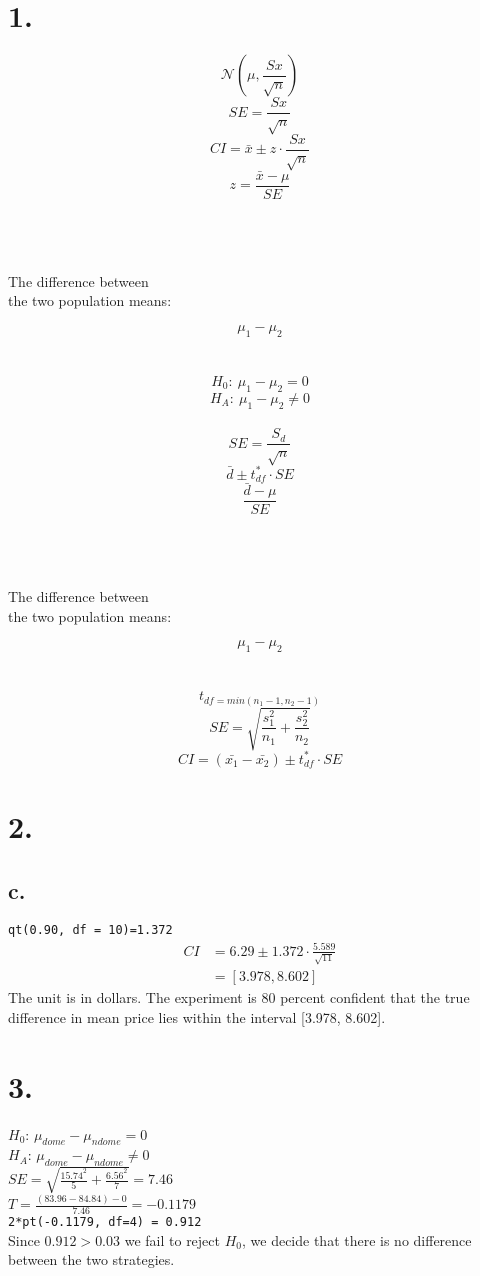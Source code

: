 \documentclass{article}
\begin{document}
\section*{1.}
$$\mathcal{N}(\mu, \frac{Sx}{\sqrt{n}})$$
$$SE = \frac{Sx}{\sqrt{n}}$$
$$CI = \bar{x} \pm z \cdot \frac{Sx}{\sqrt{n}}$$
$$z=\frac{\bar{x} - \mu}{SE}$$\\\\\\

\begin{center}
The difference between \\
the two population means:
\end{center}
$$\mu_1 - \mu_2$$\\\\

$$H_0:\ \mu_1 - \mu_2 = 0$$
$$H_A:\ \mu_1 - \mu_2 \neq 0$$\\

$$SE = \frac{S_d}{\sqrt{n}}$$
$$\bar{d} \pm t_{df}^* \cdot SE$$
$$\frac{\bar{d} - \mu}{SE}$$\\\\\\

\begin{center}
The difference between \\
the two population means:
\end{center}
$$\mu_1 - \mu_2$$\\\\
$$t_{df=min(n_1 -1, n_2 -1)}$$
$$SE = \sqrt{\frac{s_1^2}{n_1}+\frac{s_2^2}{n_2}}$$
$$CI = (\bar{x_1} - \bar{x_2}) \pm t_{df}^* \cdot SE$$

\section*{2.}
\subsection*{c.}
\texttt{qt(0.90, df = 10)=1.372}\\
\begin{align*}
CI &= 6.29 \pm 1.372 \cdot \frac{5.589}{\sqrt{11}}\\
&= [3.978, 8.602]
\end{align*}
The unit is in dollars. The experiment is 80 percent confident that the true 
difference in mean price lies within the interval [3.978, 8.602].

\section*{3.}
$H_0$: $\mu_{dome} - \mu_{ndome} = 0$\\
$H_A$: $\mu_{dome} - \mu_{ndome} \neq 0$\\
$SE = \sqrt{\frac{15.74^2}{5} + \frac{6.56^2}{7}}=7.46$\\
$T = \frac{(83.96-84.84)-0}{7.46}=-0.1179$\\
\texttt{2*pt(-0.1179, df=4) = 0.912}\\
Since $0.912 > 0.03$ we fail to reject $H_0$, we decide that there is no
difference between the two strategies.
\end{document}
